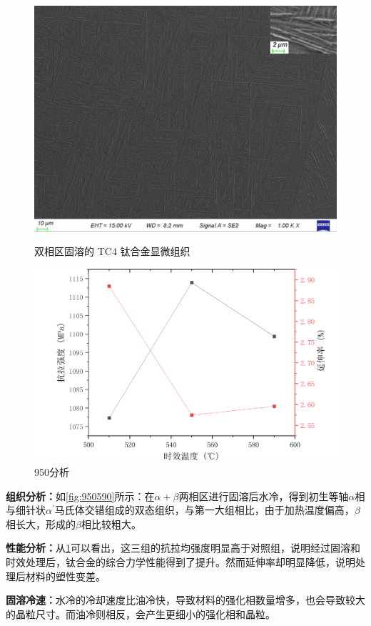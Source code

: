 \begin{figure}[htbp]
{\begin{minipage}[t]{0.33\linewidth}
			\includegraphics[width=0.9\linewidth]{pic/组织分析/950+510}
			\label{fig:950510}
		\end{minipage}%
	}%
	\centering
	\label{950}
	\caption{双相区固溶的 TC4 钛合金显微组织}
\end{figure}

		\begin{figure}[h!]
			\centering
			\includegraphics[width=0.7\linewidth]{pic/950分析}
			\caption{950分析}
			\label{fig:950}
		\end{figure}

\textbf{\faSchlix 组织分析：}如\ref{fig:950590}所示：在$ \alpha+\beta $两相区进行固溶后水冷，得到初生等轴$ \alpha $相与细针状$ \alpha^{\prime}$马氏体交错组成的双态组织，与第一大组相比，由于加热温度偏高，$ \beta $相长大，形成的$ \beta $相比较粗大。

\textbf{\faTools 性能分析：}从\ref{950}可以看出，这三组的抗拉均强度明显高于对照组，说明经过固溶和时效处理后，钛合金的综合力学性能得到了提升。然而延伸率却明显降低，说明处理后材料的塑性变差。

\textbf{\faThinkPeaks 固溶冷速：}水冷的冷却速度比油冷快，导致材料的强化相数量增多，也会导致较大的晶粒尺寸。而油冷则相反，会产生更细小的强化相和晶粒。

